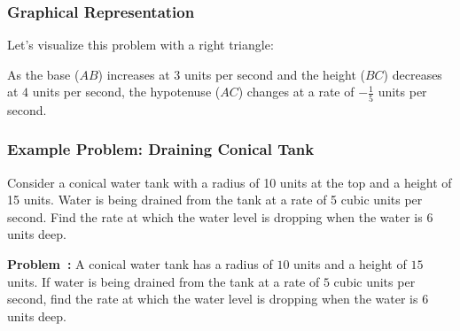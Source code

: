 \documentclass[a4paper,12pt]{book}
\newcounter{problem}
\newenvironment{problem}[1][\theproblem]
{\refstepcounter{problem}\par\medskip\noindent\textbf{Problem~#1:} \rmfamily}{\medskip}
\begin{document}
\subsubsection*{Graphical Representation}

Let's visualize this problem with a right triangle:

\begin{center}
\end{center}

As the base (\(AB\)) increases at \(3\) units per second and the height (\(BC\)) decreases at \(4\) units per second, the hypotenuse (\(AC\)) changes at a rate of \(-\frac{1}{5}\) units per second.




\subsubsection*{Example Problem: Draining Conical Tank}

Consider a conical water tank with a radius of 10 units at the top and a height of 15 units. Water is being drained from the tank at a rate of 5 cubic units per second. Find the rate at which the water level is dropping when the water is 6 units deep.

\begin{problem}
A conical water tank has a radius of \(10\) units and a height of \(15\) units. If water is being drained from the tank at a rate of \(5\) cubic units per second, find the rate at which the water level is dropping when the water is \(6\) units deep.
\end{problem}
\end{document}
